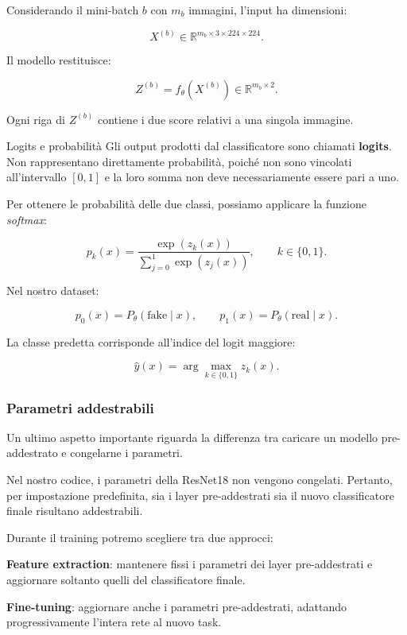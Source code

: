 \documentclass[10pt,a4paper,oneside]{book}
\begin{document}
Considerando il mini-batch $b$ con $m_b$ immagini,
l'input ha dimensioni:

\[
X^{(b)}
\in
\mathbb{R}^{m_b\times3\times224\times224}.
\]

Il modello restituisce:

\[
Z^{(b)}
=
f_{\theta}(X^{(b)})
\in
\mathbb{R}^{m_b\times2}.
\]

Ogni riga di $Z^{(b)}$ contiene i due score
relativi a una singola immagine.

\begin{definitionbox}{Logits e probabilità}
Gli output prodotti dal classificatore sono chiamati
\textbf{logits}. Non rappresentano direttamente
probabilità, poiché non sono vincolati all'intervallo
$[0,1]$ e la loro somma non deve necessariamente
essere pari a uno.

Per ottenere le probabilità delle due classi,
possiamo applicare la funzione \textit{softmax}:

\[
p_k(x)
=
\frac{\exp(z_k(x))}
{\displaystyle\sum_{j=0}^{1}\exp(z_j(x))},
\qquad k\in\{0,1\}.
\]

Nel nostro dataset:

\[
p_0(x)=P_{\theta}(\text{fake}\mid x),
\qquad
p_1(x)=P_{\theta}(\text{real}\mid x).
\]

La classe predetta corrisponde all'indice del
logit maggiore:

\[
\hat{y}(x)
=
\arg\max_{k\in\{0,1\}} z_k(x).
\]
\end{definitionbox}

\subsubsection{Parametri addestrabili}

Un ultimo aspetto importante riguarda la differenza
tra caricare un modello pre-addestrato e congelarne
i parametri.

Nel nostro codice, i parametri della ResNet18
non vengono congelati. Pertanto, per impostazione
predefinita, sia i layer pre-addestrati sia il
nuovo classificatore finale risultano addestrabili.

Durante il training potremo scegliere tra due approcci:

\textbf{Feature extraction}: mantenere fissi i
parametri dei layer pre-addestrati e aggiornare
soltanto quelli del classificatore finale.

\textbf{Fine-tuning}: aggiornare anche i parametri
pre-addestrati, adattando progressivamente
l'intera rete al nuovo task.
\end{document}
